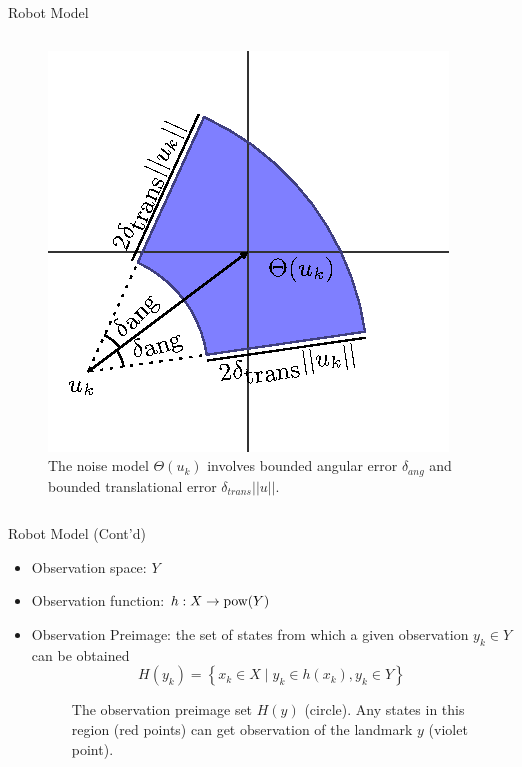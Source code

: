 \begin{frame}{Robot Model}
\begin{itemize}
\begin{columns}
\begin{column}{0.5\textwidth}
\begin{figure}
            \centering
            \includegraphics[scale=0.55]{figs/noisemodel}
            \caption{\scriptsize{The noise model $\Theta(u_k)$ involves bounded
                angular error $\delta_{ang}$ and bounded translational error
                $\delta_{trans}||u||$.}}
            \label{fig:noiseModel}
          \end{figure}
        \end{column}
    \end{columns}
\end{itemize}
  	
\end{frame}

\begin{frame}{Robot Model (Cont'd)}
  \begin{itemize}
  \item Observation space: $Y$
  \item Observation function: $h : X \to \operatorname{pow}(Y) $
  \item Observation Preimage: the set of states from which a given observation
    $y_k \in Y$ can be obtained
  \begin{equation}
    H(y_k) = \left\{ x_k \in X \mid y_k \in h(x_k), y_k \in Y \right\}
  \end{equation}
 
  \begin{figure}
    \centering
  \caption{\scriptsize{The observation preimage set $H(y)$ (circle). Any states in this
    region (red points) can get observation of the landmark $y$ (violet
    point).}}
\end{figure}
\end{itemize}
\end{frame}

